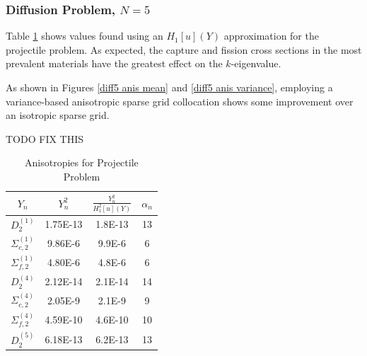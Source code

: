 \documentclass[11pt]{article}
\begin{document}
\subsubsection{Diffusion Problem, $N=5$}
Table \ref{tab:diff5 anis} shows values found using an $H_1[u](Y)$ approximation for the projectile problem.  As expected, the capture and fission cross sections in the most prevalent materials have the greatest effect on the $k$-eigenvalue.

As shown in Figures \ref{diff5 anis mean} and \ref{diff5 anis variance}, employing a variance-based anisotropic sparse grid collocation shows some improvement over an isotropic sparse grid.

TODO FIX THIS

\begin{table}[H]
\centering
\begin{tabular}{c|c c|c}
$Y_n$ & $Y_n^2$ & $\frac{Y_n^2}{H_1^2[u](Y)}$ & $\alpha_n$ \\ \hline
$D^{(1)}_2$ & 1.75E-13 & 1.8E-13 & 13 \\
$\Sigma_{c,2}^{(1)}$ & 9.86E-6 & 9.9E-6 & 6 \\
$\Sigma_{f,2}^{(1)}$ & 4.80E-6 & 4.8E-6 & 6 \\
$D^{(4)}_2$ & 2.12E-14 & 2.1E-14 & 14 \\
$\Sigma_{c,2}^{(4)}$ & 2.05E-9 & 2.1E-9 & 9 \\
$\Sigma_{f,2}^{(4)}$ & 4.59E-10 & 4.6E-10 & 10 \\
$D^{(5)}_2$ & 6.18E-13 & 6.2E-13 & 13 
\end{tabular}
\caption{Anisotropies for Projectile Problem}
\label{tab:diff5 anis}
\end{table}
\end{document}
